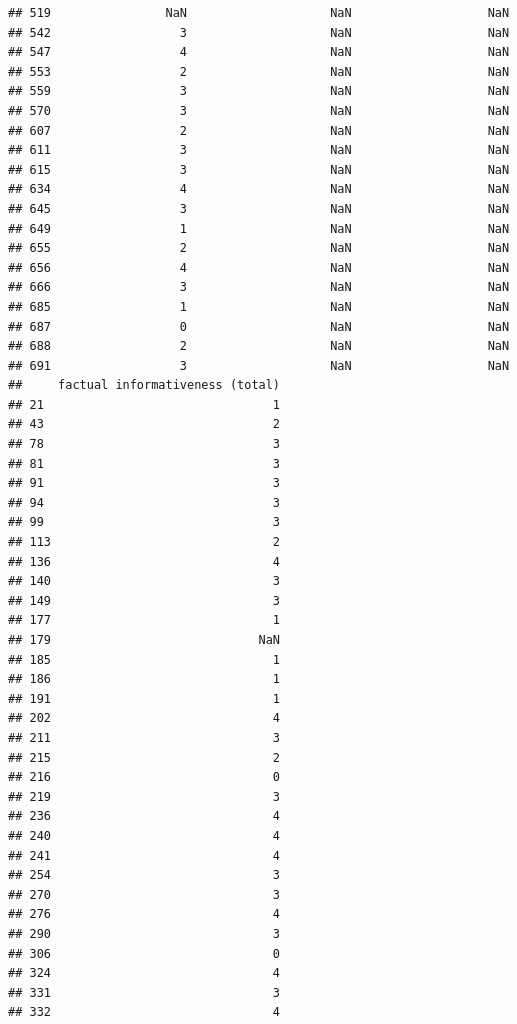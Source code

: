 \documentclass[
]{article}
\begin{document}
\begin{verbatim}
## 519                NaN                    NaN                   NaN
## 542                  3                    NaN                   NaN
## 547                  4                    NaN                   NaN
## 553                  2                    NaN                   NaN
## 559                  3                    NaN                   NaN
## 570                  3                    NaN                   NaN
## 607                  2                    NaN                   NaN
## 611                  3                    NaN                   NaN
## 615                  3                    NaN                   NaN
## 634                  4                    NaN                   NaN
## 645                  3                    NaN                   NaN
## 649                  1                    NaN                   NaN
## 655                  2                    NaN                   NaN
## 656                  4                    NaN                   NaN
## 666                  3                    NaN                   NaN
## 685                  1                    NaN                   NaN
## 687                  0                    NaN                   NaN
## 688                  2                    NaN                   NaN
## 691                  3                    NaN                   NaN
##     factual informativeness (total)
## 21                                1
## 43                                2
## 78                                3
## 81                                3
## 91                                3
## 94                                3
## 99                                3
## 113                               2
## 136                               4
## 140                               3
## 149                               3
## 177                               1
## 179                             NaN
## 185                               1
## 186                               1
## 191                               1
## 202                               4
## 211                               3
## 215                               2
## 216                               0
## 219                               3
## 236                               4
## 240                               4
## 241                               4
## 254                               3
## 270                               3
## 276                               4
## 290                               3
## 306                               0
## 324                               4
## 331                               3
## 332                               4

\end{verbatim}
\end{document}
